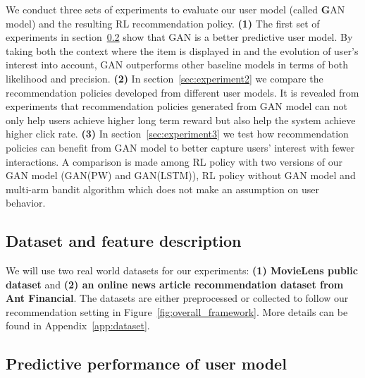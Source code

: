 \documentclass{article} %
\begin{document}
We conduct three sets of experiments to evaluate our user model (called {\textbf GAN} model) and the resulting RL recommendation policy. {\bf (1)} The first set of experiments in section~\ref{sec:experiment1} show that GAN is a better predictive user model. By taking both the context where the item is displayed in and the evolution of user's interest into account, GAN outperforms other baseline models in terms of both likelihood and precision. {\bf (2)} In section~\ref{sec:experiment2} we compare the recommendation policies developed from different user models. It is revealed from experiments that recommendation policies generated from GAN model can not only help users achieve higher long term reward but also help the system achieve higher click rate. {\bf (3)} In section~\ref{sec:experiment3} we test how recommendation policies can benefit from GAN model to better capture users' interest with fewer interactions. A comparison is made among RL policy with two versions of our GAN model (GAN(PW) and GAN(LSTM)), RL policy without GAN model and multi-arm bandit algorithm which does not make an assumption on user behavior.

\vspace{-3mm}
\subsection{Dataset and feature description}
\vspace{-3mm}

We will use two real world datasets for our experiments: {\bf (1) MovieLens public dataset} and {\bf (2) an online news article recommendation dataset from Ant Financial}. The datasets are either preprocessed or collected to follow our recommendation setting in Figure~\ref{fig:overall_framework}. More details can be found in Appendix~\ref{app:dataset}.

\vspace{-3mm}
\subsection{Predictive performance of user model}\label{sec:experiment1}
\vspace{-3mm}
\end{document}
